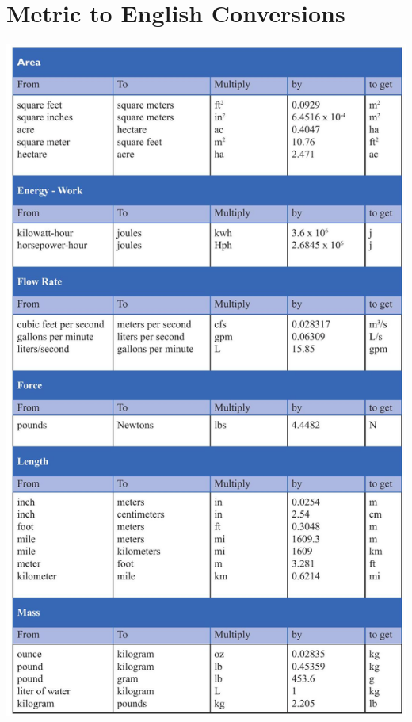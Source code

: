\documentclass[10pt]{article}
\begin{document}
\section{Metric to English Conversions}
\includegraphics[max width=\textwidth]{2022_09_11_72dbedc910e6e984560cg-55}
\end{document}
